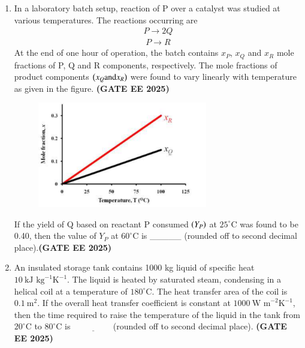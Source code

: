 \documentclass[journal,12pt,onecolumn]{IEEEtran}
\theoremstyle{remark}
\begin{document}
\begin{enumerate}
\item In a laboratory batch setup, reaction of P over a catalyst was studied at various temperatures. The reactions occurring are
	\begin{align} P\rightarrow2Q \end{align}
		\begin{align} P\rightarrow R \end{align}
At the end of one hour of operation, the batch contains $x_{P}$, $x_{Q}$ and $x_{R}$ mole fractions of P, Q and R components, respectively. The mole fractions of product components $\left(x_{Q} \text{and} x_{R}\right)$ were found to vary linearly with temperature as given in the figure. \hfill \textbf{(GATE EE 2025)}

\begin{figure}
	\begin{center}
  
 \includegraphics[width=0.7\textwidth]{figs/33.png}
	\caption{}
	\label{fig33}
\end{center}
\end{figure}
If the yield of Q based on reactant P consumed $\left(Y_{P}\right)$ at $25^{\circ}\text{C}$ was found to be 0.40, then the value of $Y_{P}$ at $60^{\circ}\text{C}$ is \_\_\_\_\_ (rounded off to second decimal place).\hfill \textbf{(GATE EE 2025)}

\item An insulated storage tank contains 1000 kg liquid of specific heat $10~\text{kJ kg}^{-1}\text{K}^{-1}$. The liquid is heated by saturated steam, condensing in a helical coil at a temperature of $180^{\circ}\text{C}$. The heat transfer area of the coil is $0.1~\text{m}^{2}$. If the overall heat transfer coefficient is constant at $1000~\text{W m}^{-2}\text{K}^{-1}$, then the time  required to raise the temperature of the liquid in the tank from $20^{\circ}\text{C}$ to $80^{\circ}\text{C}$ is $\underline{\hspace{2cm}}$(rounded off to second decimal place). \hfill \textbf{(GATE EE 2025)}




\end{enumerate}
\end{document}
